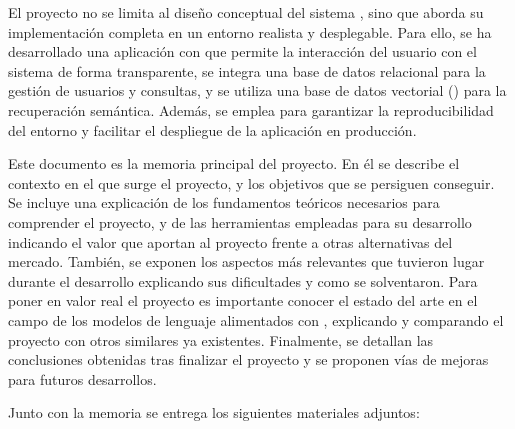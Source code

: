 El proyecto no se limita al diseño conceptual del sistema , sino que aborda su implementación completa en un entorno realista y desplegable. Para ello, se ha desarrollado una aplicación  con  que permite la interacción del usuario con el sistema de forma transparente, se integra una base de datos relacional para la gestión de usuarios y consultas, y se utiliza una base de datos vectorial () para la recuperación semántica. Además, se emplea  para garantizar la reproducibilidad del entorno y facilitar el despliegue de la aplicación en producción.

Este documento es la memoria principal del proyecto. En él se describe el contexto en el que surge el proyecto, y los objetivos que se persiguen conseguir. Se incluye una explicación de los fundamentos teóricos necesarios para comprender el proyecto, y de las herramientas empleadas para su desarrollo indicando el valor que aportan al proyecto frente a otras alternativas del mercado. También, se exponen los aspectos más relevantes que tuvieron lugar durante el desarrollo explicando sus dificultades y como se solventaron. Para poner en valor real el proyecto es importante conocer el estado del arte en el campo de los modelos de lenguaje alimentados con , explicando y comparando el proyecto con otros similares ya existentes. Finalmente, se detallan las conclusiones obtenidas tras finalizar el proyecto y se proponen vías de mejoras para futuros desarrollos.

Junto con la memoria se entrega los siguientes materiales adjuntos:

